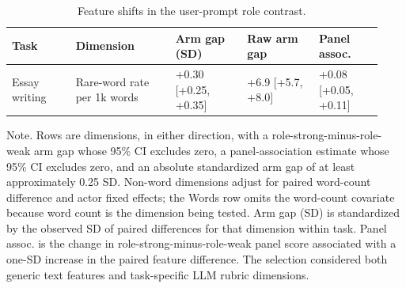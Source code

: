 \begin{table}[t]
\centering
\footnotesize
\setlength{\tabcolsep}{3pt}
\renewcommand{\arraystretch}{1.06}
\caption{Feature shifts in the user-prompt role contrast.}
\label{tab:role_features}
\begin{tabular}{@{}p{0.16\linewidth}p{0.25\linewidth}p{0.18\linewidth}p{0.18\linewidth}p{0.16\linewidth}@{}}
\toprule
Task & Dimension & Arm gap (SD) & Raw arm gap & Panel assoc. \\
\midrule
Essay writing & Rare-word rate per 1k words & +0.30 [+0.25, +0.35] & +6.9 [+5.7, +8.0] & +0.08 [+0.05, +0.11] \\
\bottomrule
\end{tabular}
\begin{minipage}{0.98\linewidth}
\footnotesize
Note. Rows are dimensions, in either direction, with a role-strong-minus-role-weak arm gap whose 95\% CI excludes zero, a panel-association estimate whose 95\% CI excludes zero, and an absolute standardized arm gap of at least approximately 0.25 SD. Non-word dimensions adjust for paired word-count difference and actor fixed effects; the Words row omits the word-count covariate because word count is the dimension being tested. Arm gap (SD) is standardized by the observed SD of paired differences for that dimension within task. Panel assoc. is the change in role-strong-minus-role-weak panel score associated with a one-SD increase in the paired feature difference. The selection considered both generic text features and task-specific LLM rubric dimensions.
\end{minipage}
\end{table}
